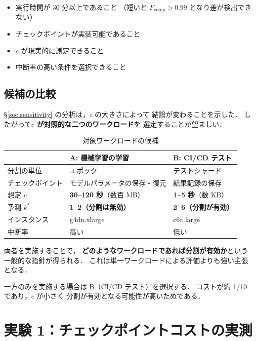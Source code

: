 \documentclass[11pt,a4paper]{ltjsreport}
\newcommand{\Fcomp}{F_{\mathrm{comp}}}
\begin{document}
\begin{itemize}
  \item 実行時間が 30 分以上であること
        （短いと $\Fcomp > 0.99$ となり差が検出できない）
  \item チェックポイントが実装可能であること
  \item $c$ が現実的に測定できること
  \item 中断率の高い条件を選択できること
\end{itemize}

\subsection{候補の比較}

\S\ref{sec:sensitivity} の分析は，$c$ の大きさによって
結論が変わることを示した．
したがって\textbf{$c$ が対照的な二つのワークロード}を
選定することが望ましい．

\begin{table}[htbp]
\centering
\caption{対象ワークロードの候補}
\label{tab:usecases}
\small
\begin{tabularx}{\textwidth}{@{}lXX@{}}
\toprule
 & \textbf{A: 機械学習の学習} & \textbf{B: CI/CD テスト} \\
\midrule
分割の単位   & エポック & テストシャード \\
チェックポイント & モデルパラメータの保存・復元 & 結果記録の保存 \\
想定 $c$     & \textbf{30--120 秒}（数百 MB） & \textbf{1--5 秒}（数 KB） \\
予測 $k^{*}$ & \textbf{1--2（分割は無効）} & \textbf{2--6（分割が有効）} \\
インスタンス & g4dn.xlarge & c6a.large \\
中断率       & 高い & 低い \\
\bottomrule
\end{tabularx}
\end{table}

両者を実施することで，
\textbf{どのようなワークロードであれば分割が有効か}という
一般的な指針が得られる．
これは単一ワークロードによる評価よりも強い主張となる．

一方のみを実施する場合は B（CI/CD テスト）を選択する．
コストが約 1/10 であり，$c$ が小さく
分割が有効となる可能性が高いためである．

\section{実験 1：チェックポイントコストの実測}
\end{document}
